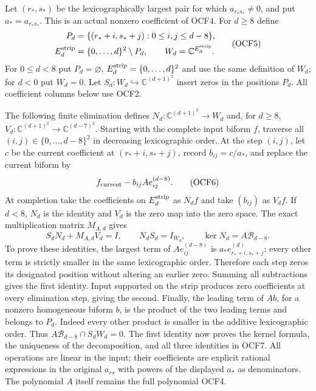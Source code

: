 Let $(r_*,s_*)$ be the lexicographically largest pair for which
$a_{r_*s_*}\ne0$, and put $a_*=a_{r_*s_*}$. This is an
actual nonzero coefficient of OCF4. For $d\geq8$ define
\[
 \begin{split}
 P_d&=\{(r_*+i,s_*+j):0\leq i,j\leq d-8\},\\
 E_d^{\rm strip}&=\{0,\ldots,d\}^2\setminus P_d,\qquad
 W_d=\mathbb C^{E_d^{\rm strip}}.
 \end{split}\tag{OCF5}
\]
For $0\leq d<8$ put $P_d=\varnothing$,
$E_d^{\rm strip}=\{0,\ldots,d\}^2$ and use the same definition
of $W_d$; for $d<0$ put $W_d=0$. Let
$S_d:W_d\hookrightarrow\mathbb C^{(d+1)^2}$ insert zeros in
the positions $P_d$. All coefficient columns below use OCF2.

The following finite elimination defines
$N_d:\mathbb C^{(d+1)^2}\to W_d$ and, for $d\geq8$,
$V_d:\mathbb C^{(d+1)^2}\to\mathbb C^{(d-7)^2}$.
Starting with the complete input biform $f$, traverse all
$(i,j)\in\{0,\ldots,d-8\}^2$ in decreasing lexicographic order.
At the step $(i,j)$, let $c$ be the current coefficient at
$(r_*+i,s_*+j)$, record $b_{ij}=c/a_*$, and replace the current
biform by
\[
       f_{\rm current}-b_{ij}A e_{ij}^{(d-8)}.
 \tag{OCF6}
\]
At completion take the coefficients on $E_d^{\rm strip}$ as
$N_df$ and take $(b_{ij})$ as $V_df$. If $d<8$, $N_d$ is the
identity and $V_d$ is the zero map into the zero space.
The exact multiplication matrix $M_{A,d}$ gives
\[
 S_dN_d+M_{A,d}V_d=I,\qquad
 N_dS_d=I_{W_d},\qquad
 \ker N_d=A\mathcal B_{d-8}.
 \tag{OCF7}
\]
To prove these identities, the largest term of
$A e_{ij}^{(d-8)}$ is $a_*e_{r_*+i,s_*+j}^{(d)}$;
every other term is strictly smaller in the same lexicographic
order. Therefore each step zeros its designated position without
altering an earlier zero. Summing all subtractions gives the
first identity. Input supported on the strip produces zero
coefficients at every elimination step, giving the second.
Finally, the leading term of $Ab$, for a nonzero homogeneous
biform $b$, is the product of the two leading terms and belongs
to $P_d$. Indeed every other product is smaller in the additive
lexicographic order. Thus
$A\mathcal B_{d-8}\cap S_dW_d=0$. The first identity now proves
the kernel formula, the uniqueness of the decomposition, and all
three identities in OCF7. All operations are linear in the input;
their coefficients are explicit rational expressions in the
original $a_{rs}$ with powers of the displayed $a_*$ as denominators.
The polynomial $A$ itself remains the full polynomial OCF4.

